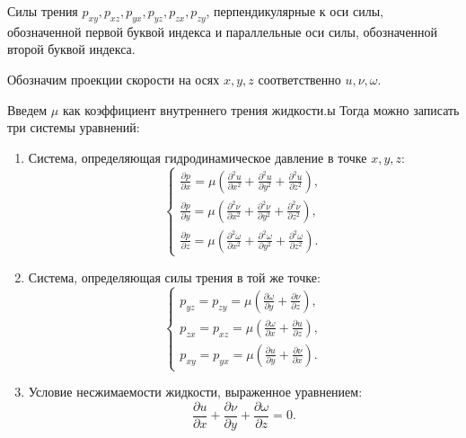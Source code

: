 \documentclass[a4paper,14pt]{extarticle}
\begin{document}
Силы трения $p_{xy}, p_{xz}, p_{yx}, p_{yz}, p_{zx}, p_{zy}$, перпендикулярные к оси силы, обозначенной первой буквой индекса и параллельные оси силы, обозначенной второй буквой индекса.

Обозначим проекции скорости на осях $x, y, z \text{ соответственно}$ $u, \nu, \omega$.

Введем $\mu$ как коэффициент внутреннего трения жидкости.ы
Тогда можно записать три системы уравнений:
\begin{enumerate}
	\item Система, определяющая гидродинамическое давление в
	точке $x, y, z$:
	\begin{equation}
		\label{eqfi}
		\begin{cases}
			\frac{\partial p}{\partial x} = \mu \left( \frac{\partial^2 u}{\partial x^2} + \frac{\partial^2 u}{\partial y^2} + \frac{\partial^2 u}{\partial z^2} \right), \\
			\frac{\partial p}{\partial y} = \mu \left( \frac{\partial^2 \nu}{\partial x^2} + \frac{\partial^2 \nu}{\partial y^2} + \frac{\partial^2 \nu}{\partial z^2} \right), \\
			\frac{\partial p}{\partial z} = \mu \left( \frac{\partial^2 \omega}{\partial x^2} + \frac{\partial^2 \omega}{\partial y^2} + \frac{\partial^2 \omega}{\partial z^2} \right).
		\end{cases}
	\end{equation}
	\item Система, определяющая силы трения в той же точке:
	\begin{equation}
		\label{eqsi}
		\begin{cases}
			p_{yz} = p_{zy} = \mu \left(\frac{\partial \omega}{\partial y} + \frac{\partial \nu}{\partial z} \right), \\
			p_{zx} = p_{xz} = \mu \left( \frac{\partial \omega}{\partial x} +  \frac{\partial u}{\partial z} \right), \\
			p_{xy} = p_{yx} = \mu \left(  \frac{\partial u}{\partial y} + \frac{\partial \nu}{\partial x} \right).
		\end{cases}
	\end{equation}
	\item Условие несжимаемости жидкости, выраженное уравнением: 
	\begin{equation}
		\label{eqthi}
		\frac{\partial u}{\partial x} + \frac{\partial \nu}{\partial y} + \frac{\partial \omega}{\partial z} = 0.
	\end{equation}
	
\end{enumerate}
\end{document}
